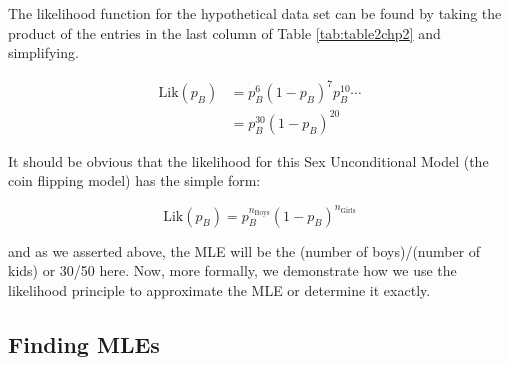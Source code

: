 \documentclass[
]{krantz}
\newcommand{\lik}{\mathrm{Lik}}
\begin{document}
\begin{table}

\caption{\label{tab:table2chp2}The likelihood factors for the hypothetical data set of n=50 children.}
\centering
{}
\end{table}

The likelihood function for the hypothetical data set can be found by taking the product of the entries in the last column of Table \ref{tab:table2chp2} and simplifying.

\begin{equation}
\begin{split}
 \lik(p_B) &= p_B^{6}(1-p_B)^{7}p_B^{10} \cdots \\
 &= p_B^{30}(1-p_B)^{20}
\end{split}
\label{eq:lik30} 
\end{equation}

It should be obvious that the likelihood for this Sex Unconditional Model (the coin flipping model) has the simple form:

\begin{equation*}
\lik(p_B) = p_B^{n_\textrm{Boys}}(1-p_B)^{n_\textrm{Girls}}
\end{equation*}

and as we asserted above, the MLE will be the (number of boys)/(number of kids) or 30/50 here. Now, more formally, we demonstrate how we use the likelihood principle to approximate the MLE or determine it exactly.

\hypertarget{findMLE.sec}{%
\subsection{Finding MLEs}\label{findMLE.sec}}
\end{document}
